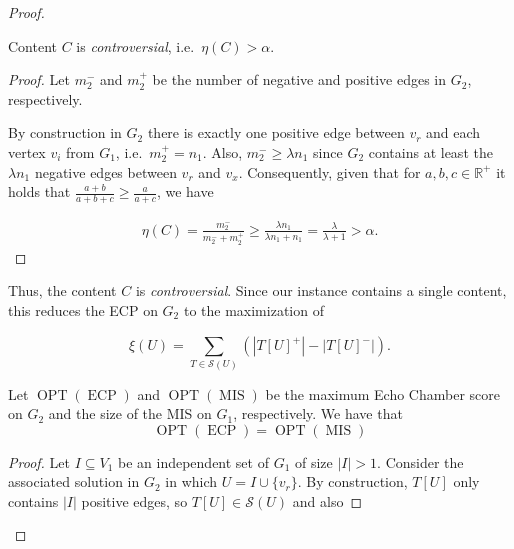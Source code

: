 \begin{proof}
	\begin{claim}
		\label{th:claim-controversial}
		Content $C$ is \emph{controversial}, i.e.\ $\eta(C) > \alpha $.
	\end{claim}
	\begin{proof}
		Let $m_{2}^{-} $ and $m_{2}^{+} $ be the number of negative and
		positive edges in $G_2$, respectively.

		By construction in $G_2$ there is exactly one
		positive edge between $v_r$ and each vertex $v_i$ from $ G_1$, i.e.\
		$m_{2}^{+} = n_{1} $. Also,
		$m_{2}^{-} \geq \lambda n_{1} $ since $G_2$ contains at least the $\lambda
			n_1$ negative edges between $v_r$ and $v_x$. Consequently, given that for $a, b, c \in \mathbb{R}^{+}$ it holds that $\frac{a +
				b}{a + b + c} \geq \frac{a}{a + c} $, we have

		\begin{align}
			\eta(C) = \frac{m_{2}^{-} }{m_{2}^{-} +
				m_{2}^{+} } \geq \frac{\lambda n_{1}}{\lambda n_{1}
				+ n_{1} } = \frac{\lambda }{\lambda + 1} > \alpha.
		\end{align}
	\end{proof}

	Thus, the content $C$ is \emph{controversial}. Since our instance contains
	a single content, this reduces the \acrshort{ECP} on $G_2$ to the maximization of

	\begin{equation}
		\label{eq:score}
		\xi(U) = \sum^{}_{T \in \mathcal{S}(U) } (| T[U]^{+} | - | T[U]^{-} |).
	\end{equation}

	\bigskip

	\begin{claim}
		\label{th:opt-equality}
		Let $\operatorname{OPT}(\operatorname{ECP})$ and
		$\operatorname{OPT}(\operatorname{MIS})$ be the maximum Echo Chamber score on
		$G_2$ and the size of the MIS on $G_1$, respectively.
		We have that
		\begin{equation}
			\operatorname{OPT}(\operatorname{ECP}) = \operatorname{OPT}(\operatorname{MIS})
		\end{equation}
	\end{claim}

	\begin{proof}
		Let $I \subseteq V_{1} $ be an independent set of $G_1$ of size $|I| >
			1$. Consider the associated solution in $G_2$ in which $U = I \cup
			\{v_{r} \}$. By construction, $T[U]$ only contains $|I|$ positive
		edges, so $T[U] \in \mathcal{S}(U)$ and also


\end{proof}
\end{proof}
